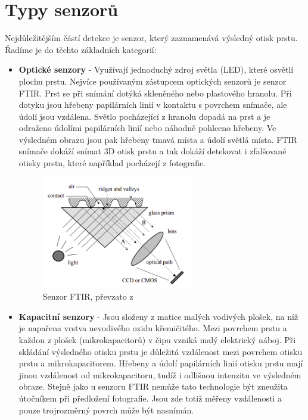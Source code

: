 \section{Typy senzorů}
Nejdůležitějším částí detekce je senzor, který zaznamenává výsledný otisk prstu. Řadíme je do těchto základních kategorií:
\begin{itemize}
\item \textbf{Optické senzory} - Využívají jednoduchý zdroj světla (LED), které osvětlí plochu prstu.\cite{Drahansky} Nejvíce používaným zástupcem optických senzorů je senzor FTIR. Prst se při snímání dotýká skleněného nebo plastového hranolu. Při dotyku jsou hřebeny papilárních linií v kontaktu s povrchem snímače, ale údolí jsou vzdálena. Světlo pocházející z hranolu dopadá na prst a je odraženo údolími papilárních liníí nebo náhodně pohlceno hřebeny. Ve výsledném obrazu jsou pak hřebeny tmavá místa a údolí světlá místa. FTIR snímače dokáží snímat 3D otisk prstu a tak dokáží detekovat i zfalšované otisky prstu, které například pocházejí z fotografie. \cite{Maltoni2009}

\begin{figure}[htbp]
    \centering
    \includegraphics[width=250px]{obrazky-figures/ftiredit.png}
    \caption{Senzor FTIR, převzato z \cite{Maltoni2009}}
\end{figure}

\item \textbf{Kapacitní senzory} - Jsou složeny z matice malých vodivých plošek, na níž je napařena vrstva nevodivého oxidu křemičitého.\cite{Drahansky} Mezi povrchem prstu a každou z plošek (mikrokapacitorů) v čipu vzniká malý elektrický náboj. Při skládání výsledného otisku prstu je důležitá vzdálenost mezi povrchem otisku prstu a mikrokapacitorem. Hřebeny a údolí papilárních linií otisku prstu mají jinou vzdálenost od mikrokapacitoru, tudíž i odlišnou intenzitu ve výsledném obraze. Stejně jako u senzoru FTIR nemůže tato technologie být zneužita útočníkem při předložení fotografie. Jsou zde totiž měřeny vzdálenosti a pouze trojrozměrný povrch může být nasnímán.\cite{Maltoni2009}


\end{itemize}
